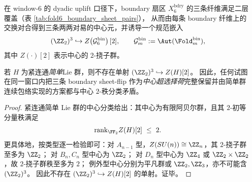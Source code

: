 \begin{theorem}\label{thm:window6-center-2rank-excludes-simple-groups}
在 window-\(6\) 的 dyadic uplift 口径下，boundary 扇区 \(X_6^{\mathrm{bdry}}\) 的三条纤维满足二层覆盖（表 \ref{tab:fold6_boundary_sheet_pairs}），
从而由每条 boundary 纤维上的交换对合得到三条两两对易的中心元，并诱导一个规范嵌入
\[
(\ZZ_2)^3\hookrightarrow Z\!\left(\mathcal G_6^{\mathrm{bin}}\right)[2],
\qquad
\mathcal G_m^{\mathrm{bin}}:=\Aut(\Fold_m^{\mathrm{bin}}),
\]
其中 \(Z(\cdot)[2]\) 表示中心的 \(2\)-挠子群。
\par
若 \(H\) 为紧连通\emph{简单}Lie 群，则不存在单射
\(
(\ZZ_2)^3\hookrightarrow Z(H)[2]
\)。
因此，任何试图在同一窗口内把三条 boundary sheet-flip 作为\emph{中心超选择荷}完整保留并由简单群连续包络实现的方案都与中心 \(2\)-秩分类矛盾。
\end{theorem}

\begin{proof}
紧连通简单 Lie 群的中心分类给出：其中心为有限阿贝尔群，且其 \(2\)-初等分量秩满足
\[
\mathrm{rank}_{\FF_2} Z(H)[2]\ \le\ 2.
\]
更具体地，按类型逐一检验即可：对 \(A_{n-1}\) 型，\(Z(SU(n))\cong \ZZ_n\)，其 \(2\)-挠子群至多为 \(\ZZ_2\)；
对 \(B_n,C_n\) 型中心为 \(\ZZ_2\)；
对 \(D_n\) 型中心为 \(\ZZ_4\) 或 \(\ZZ_2\times \ZZ_2\)，故 \(2\)-挠子群秩至多为 \(2\)；
例外型中心分别为平凡群或 \(\ZZ_2,\ZZ_3\)，亦不可能含 \((\ZZ_2)^3\)。
因此不存在 \((\ZZ_2)^3\hookrightarrow Z(H)[2]\) 的单射。证毕。
\end{proof}
